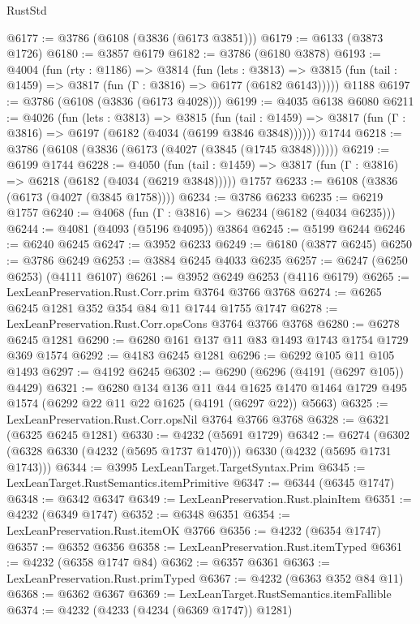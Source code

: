 \begin{lexlean}{RustStd}
\begin{coremodule}
@6177 := @3786 (@6108 (@3836 (@6173 @3851)))
@6179 := @6133 (@3873 @1726)
@6180 := @3857 @6179
@6182 := @3786 (@6180 @3878)
@6193 := @4004
    (fun (rty : @1186) =>
    @3814
      (fun (lets : @3813) =>
      @3815 (fun (tail : @1459) => @3817 (fun (Γ : @3816) => @6177 (@6182 @6143)))))
    @1188
@6197 := @3786 (@6108 (@3836 (@6173 @4028)))
@6199 := @4035 @6138 @6080
@6211 := @4026
    (fun (lets : @3813) =>
    @3815
      (fun (tail : @1459) => @3817 (fun (Γ : @3816) => @6197 (@6182 (@4034 (@6199 @3846 @3848))))))
    @1744
@6218 := @3786 (@6108 (@3836 (@6173 (@4027 (@3845 (@1745 @3848))))))
@6219 := @6199 @1744
@6228 := @4050
    (fun (tail : @1459) => @3817 (fun (Γ : @3816) => @6218 (@6182 (@4034 (@6219 @3848)))))
    @1757
@6233 := @6108 (@3836 (@6173 (@4027 (@3845 @1758))))
@6234 := @3786 @6233
@6235 := @6219 @1757
@6240 := @4068 (fun (Γ : @3816) => @6234 (@6182 (@4034 @6235)))
@6244 := @4081 (@4093 (@5196 @4095)) @3864
@6245 := @5199 @6244
@6246 := @6240 @6245
@6247 := @3952 @6233
@6249 := @6180 (@3877 @6245)
@6250 := @3786 @6249
@6253 := @3884 @6245 @4033 @6235
@6257 := @6247 (@6250 @6253) (@4111 @6107)
@6261 := @3952 @6249 @6253 (@4116 @6179)
@6265 := LexLeanPreservation.Rust.Corr.prim @3764 @3766 @3768
@6274 := @6265 @6245 @1281 @352 @354 @84 @11 @1744 @1755 @1747
@6278 := LexLeanPreservation.Rust.Corr.opsCons @3764 @3766 @3768
@6280 := @6278 @6245 @1281
@6290 := @6280 @161 @137 @11 @83 @1493 @1743 @1754 @1729 @369 @1574
@6292 := @4183 @6245 @1281
@6296 := @6292 @105 @11 @105 @1493
@6297 := @4192 @6245
@6302 := @6290 (@6296 (@4191 (@6297 @105)) @4429)
@6321 := @6280
    @134
    @136
    @11
    @44
    @1625
    @1470
    @1464
    @1729
    @495
    @1574
    (@6292 @22 @11 @22 @1625 (@4191 (@6297 @22)) @5663)
@6325 := LexLeanPreservation.Rust.Corr.opsNil @3764 @3766 @3768
@6328 := @6321 (@6325 @6245 @1281)
@6330 := @4232 (@5691 @1729)
@6342 := @6274 (@6302 (@6328 @6330 (@4232 (@5695 @1737 @1470))) @6330 (@4232 (@5695 @1731 @1743)))
@6344 := @3995 LexLeanTarget.TargetSyntax.Prim
@6345 := LexLeanTarget.RustSemantics.itemPrimitive
@6347 := @6344 (@6345 @1747)
@6348 := @6342 @6347
@6349 := LexLeanPreservation.Rust.plainItem
@6351 := @4232 (@6349 @1747)
@6352 := @6348 @6351
@6354 := LexLeanPreservation.Rust.itemOK @3766
@6356 := @4232 (@6354 @1747)
@6357 := @6352 @6356
@6358 := LexLeanPreservation.Rust.itemTyped
@6361 := @4232 (@6358 @1747 @84)
@6362 := @6357 @6361
@6363 := LexLeanPreservation.Rust.primTyped
@6367 := @4232 (@6363 @352 @84 @11)
@6368 := @6362 @6367
@6369 := LexLeanTarget.RustSemantics.itemFallible
@6374 := @4232 (@4233 (@4234 (@6369 @1747)) @1281)

\end{coremodule}
\end{lexlean}
